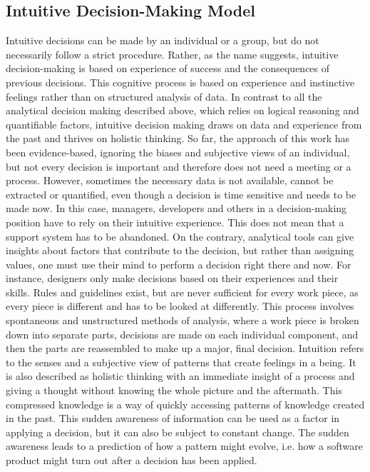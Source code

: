 \subsection{Intuitive Decision-Making Model}
Intuitive decisions can be made by an individual or a group, but do not necessarily follow a strict procedure. Rather, as the name suggests, intuitive decision-making is based on experience of success and the consequences of previous decisions. This cognitive process is based on experience and instinctive feelings rather than on structured analysis of data. In contrast to all the analytical decision making described above, which relies on logical reasoning and quantifiable factors, intuitive decision making draws on data and experience from the past and thrives on holistic thinking. 
\newline \noindent So far, the approach of this work has been evidence-based, ignoring the biases and subjective views of an individual, but not every decision is important and therefore does not need a meeting or a process. However, sometimes the necessary data is not available, cannot be extracted or quantified, even though a decision is time sensitive and needs to be made now. In this case, managers, developers and others in a decision-making position have to rely on their intuitive experience. 
\newline \noindent This does not mean that a support system has to be abandoned. On the contrary, analytical tools can give insights about factors that contribute to the decision, but rather than assigning values, one must use their mind to perform a decision right there and now. For instance, designers only make decisions based on their experiences and their skills. Rules and guidelines exist, but are never sufficient for every work piece, as every piece is different and has to be looked at differently. This process involves spontaneous and unstructured methods of analysis, where a work piece is broken down into separate parts, decisions are made on each individual component, and then the parts are reassembled to make up a major, final decision. 
\newline \noindent Intuition refers to the senses and a subjective view of patterns that create feelings in a being. It is also described as holistic thinking with an immediate insight of a process and giving a thought without knowing the whole picture and the aftermath. This compressed knowledge is a way of quickly accessing patterns of knowledge created in the past. This sudden awareness of information can be used as a factor in applying a decision, but it can also be subject to constant change. The sudden awareness leads to a prediction of how a pattern might evolve, i.e. how a software product might turn out after a decision has been applied. 

